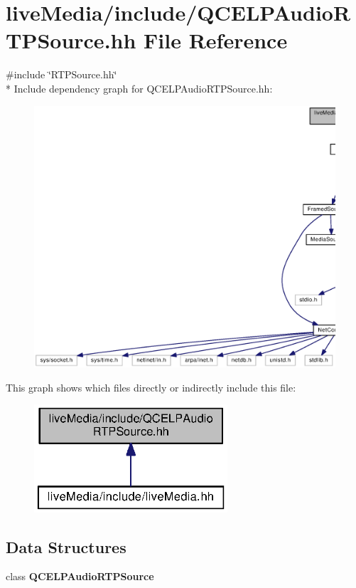 \section{live\+Media/include/\+Q\+C\+E\+L\+P\+Audio\+R\+T\+P\+Source.hh File Reference}
\label{QCELPAudioRTPSource_8hh}
{\ttfamily \#include \char`\"{}R\+T\+P\+Source.\+hh\char`\"{}}\\*
Include dependency graph for Q\+C\+E\+L\+P\+Audio\+R\+T\+P\+Source.\+hh\+:
\nopagebreak
\begin{figure}[H]
\begin{center}
\leavevmode
\includegraphics[width=350pt]{QCELPAudioRTPSource_8hh__incl}
\end{center}
\end{figure}
This graph shows which files directly or indirectly include this file\+:
\nopagebreak
\begin{figure}[H]
\begin{center}
\leavevmode
\includegraphics[width=204pt]{QCELPAudioRTPSource_8hh__dep__incl}
\end{center}
\end{figure}
\subsection*{Data Structures}
\begin{DoxyCompactItemize}
\item 
class {\bf Q\+C\+E\+L\+P\+Audio\+R\+T\+P\+Source}
\end{DoxyCompactItemize}
